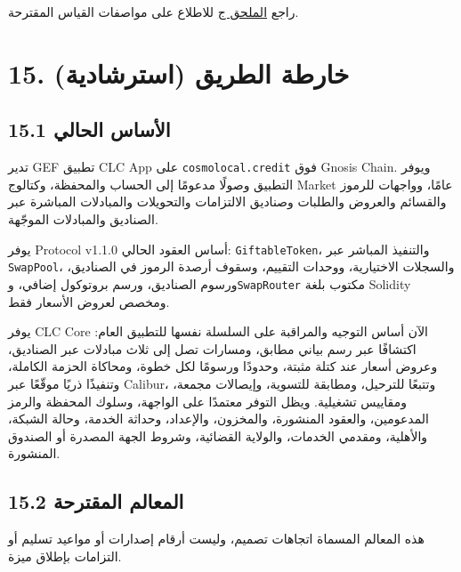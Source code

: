 \documentclass[11pt]{article}
\begin{document}
راجع \href{https://docs.cosmolocal.credit/ar/white-paper/appendix-c-kpi-definitions}{الملحق ج} للاطلاع على مواصفات القياس المقترحة.


\section*{15. خارطة الطريق (استرشادية)}

\subsection*{15.1 الأساس الحالي}

تدير GEF تطبيق CLC App على \texttt{cosmolocal.credit} فوق Gnosis Chain. ويوفر التطبيق وصولًا مدعومًا إلى الحساب والمحفظة، وكتالوج Market عامًا، وواجهات للرموز والقسائم والعروض والطلبات وصناديق الالتزامات والتحويلات والمبادلات المباشرة عبر الصناديق والمبادلات الموجّهة.

يوفر Protocol v1.1.0 أساس العقود الحالي: \texttt{GiftableToken}، والتنفيذ المباشر عبر \texttt{SwapPool}، والسجلات الاختيارية، ووحدات التقييم، وسقوف أرصدة الرموز في الصناديق، ورسوم الصناديق، ورسم بروتوكول إضافي، و\texttt{SwapRouter} مكتوب بلغة Solidity ومخصص لعروض الأسعار فقط.

يوفر CLC Core الآن أساس التوجيه والمراقبة على السلسلة نفسها للتطبيق العام: اكتشافًا عبر رسم بياني مطابق، ومسارات تصل إلى ثلاث مبادلات عبر الصناديق، وعروض أسعار عند كتلة مثبتة، وحدودًا ورسومًا لكل خطوة، ومحاكاة الحزمة الكاملة، وتنفيذًا ذريًا موقّعًا عبر Calibur، وتتبعًا للترحيل، ومطابقة للتسوية، وإيصالات مجمعة، ومقاييس تشغيلية. ويظل التوفر معتمدًا على الواجهة، وسلوك المحفظة والرمز المدعومين، والعقود المنشورة، والمخزون، والإعداد، وحداثة الخدمة، وحالة الشبكة، والأهلية، ومقدمي الخدمات، والولاية القضائية، وشروط الجهة المصدرة أو الصندوق المنشورة.

\subsection*{15.2 المعالم المقترحة}

هذه المعالم المسماة اتجاهات تصميم، وليست أرقام إصدارات أو مواعيد تسليم أو التزامات بإطلاق ميزة.
\end{document}

